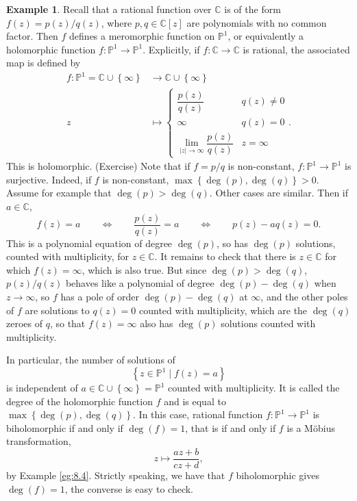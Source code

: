 \documentclass{article}
\newcommand{\C}{\mathbb{C}}
\renewcommand{\P}{\mathbb{P}}
\newcommand{\rb}[1]{\left( #1 \right)}
\renewcommand{\sb}[1]{\left[ #1 \right]}
\newcommand{\cb}[1]{\left\{ #1 \right\}}
\newcommand{\abs}[1]{\left\lvert #1 \right\rvert}
\theoremstyle{definition}\newtheorem{definition}{Definition}[section]
\theoremstyle{definition}\newtheorem{notation}[definition]{Notation}
\theoremstyle{definition}\newtheorem{remark}[definition]{Remark}
\theoremstyle{definition}\newtheorem{example1}[definition]{Example}
\theoremstyle{definition}\newtheorem{fact}{Fact}
\theoremstyle{definition}\newtheorem{exercise}{Exercise}
\theoremstyle{definition}\newtheorem*{example2}{Example}
\begin{document}
\begin{example1}
Recall that a rational function over $ \C $ is of the form $ f\rb{z} = p\rb{z} / q\rb{z} $, where $ p, q \in \C\sb{z} $ are polynomials with no common factor. Then $ f $ defines a meromorphic function on $ \P^1 $, or equivalently a holomorphic function $ f : \P^1 \to \P^1 $. Explicitly, if $ f : \C \to \C $ is rational, the associated map is defined by
\begin{align*}
f : \P^1 = \C \cup \cb{\infty} & \to \C \cup \cb{\infty} \\
z & \mapsto \begin{cases}
\dfrac{p\rb{z}}{q\rb{z}} & q\rb{z} \ne 0 \\
\infty & q\rb{z} = 0 \\
\lim_{\abs{z} \to \infty} \dfrac{p\rb{z}}{q\rb{z}} & z = \infty
\end{cases}.
\end{align*}
This is holomorphic. (Exercise) Note that if $ f = p / q $ is non-constant, $ f : \P^1 \to \P^1 $ is surjective. Indeed, if $ f $ is non-constant, $ \max\cb{\deg\rb{p}, \deg\rb{q}} > 0 $. Assume for example that $ \deg\rb{p} > \deg\rb{q} $. Other cases are similar. Then if $ a \in \C $,
$$ f\rb{z} = a \qquad \iff \qquad \dfrac{p\rb{z}}{q\rb{z}} = a \qquad \iff \qquad p\rb{z} - aq\rb{z} = 0. $$
This is a polynomial equation of degree $ \deg\rb{p} $, so has $ \deg\rb{p} $ solutions, counted with multiplicity, for $ z \in \C $. It remains to check that there is $ z \in \C $ for which $ f\rb{z} = \infty $, which is also true. But since $ \deg\rb{p} > \deg\rb{q} $, $ p\rb{z} / q\rb{z} $ behaves like a polynomial of degree $ \deg\rb{p} - \deg\rb{q} $ when $ z \to \infty $, so $ f $ has a pole of order $ \deg\rb{p} - \deg\rb{q} $ at $ \infty $, and the other poles of $ f $ are solutions to $ q\rb{z} = 0 $ counted with multiplicity, which are the $ \deg\rb{q} $ zeroes of $ q $, so that $ f\rb{z} = \infty $ also has $ \deg\rb{p} $ solutions counted with multiplicity.
\end{example1}

In particular, the number of solutions of
$$ \cb{z \in \P^1 \mid f\rb{z} = a} $$
is independent of $ a \in \C \cup \cb{\infty} = \P^1 $ counted with multiplicity. It is called the degree of the holomorphic function $ f $ and is equal to $ \max\cb{\deg\rb{p}, \deg\rb{q}} $. In this case, rational function $ f : \P^1 \to \P^1 $ is biholomorphic if and only if $ \deg\rb{f} = 1 $, that is if and only if $ f $ is a M\"obius transformation,
$$ z \mapsto \dfrac{az + b}{cz + d}, $$
by Example \ref{eg:8.4}. Strictly speaking, we have that $ f $ biholomorphic gives $ \deg\rb{f} = 1 $, the converse is easy to check.
\end{document}
